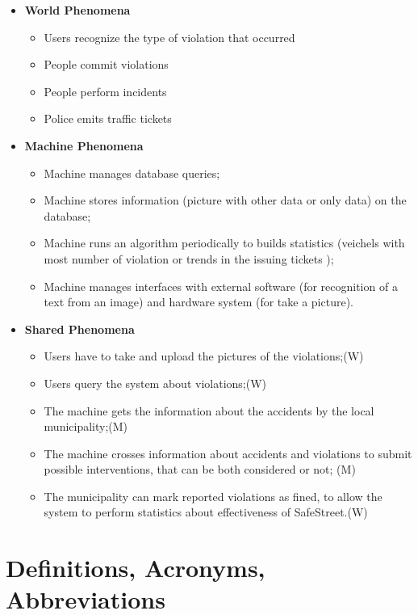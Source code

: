 \documentclass[../RASD.tex]{subfiles}
\begin{document}
    \begin{itemize}
        \item \textbf{World Phenomena}
        \begin{itemize}
            \item Users recognize the type of violation that occurred
            \item People commit violations
            \item People perform incidents
            \item Police emits traffic tickets
        \end{itemize}
        \item \textbf{Machine Phenomena}
        \begin{itemize}
            \item Machine manages database queries;
            \item Machine stores information (picture with other data or only data) on the database;
            \item Machine runs an algorithm periodically to builds statistics (veichels with most number of violation or trends in the issuing tickets );
            \item Machine manages interfaces with external software (for recognition of a text from an image) and hardware system (for take a picture).
        \end{itemize}
        \item \textbf{Shared Phenomena}
        \begin{itemize}
            \item Users have to take and upload the pictures of the violations;(W)
            \item Users query the system about violations;(W)
            \item The machine gets the information about the accidents by the local municipality;(M)
            \item The machine crosses information about accidents and violations to submit possible interventions, that can be both considered or not; (M)
            \item The municipality can mark reported violations as fined, to allow the system to perform statistics about effectiveness of SafeStreet.(W)
        \end{itemize}
    \end{itemize}

    \section{Definitions, Acronyms, Abbreviations}\label{sec:definitions,-acronyms,-abbreviations}
\end{document}

